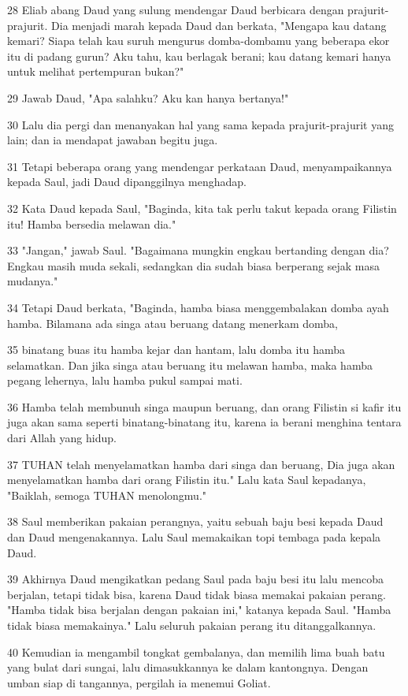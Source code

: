 \par 28 Eliab abang Daud yang sulung mendengar Daud berbicara dengan prajurit-prajurit. Dia menjadi marah kepada Daud dan berkata, "Mengapa kau datang kemari? Siapa telah kau suruh mengurus domba-dombamu yang beberapa ekor itu di padang gurun? Aku tahu, kau berlagak berani; kau datang kemari hanya untuk melihat pertempuran bukan?"
\par 29 Jawab Daud, "Apa salahku? Aku kan hanya bertanya!"
\par 30 Lalu dia pergi dan menanyakan hal yang sama kepada prajurit-prajurit yang lain; dan ia mendapat jawaban begitu juga.
\par 31 Tetapi beberapa orang yang mendengar perkataan Daud, menyampaikannya kepada Saul, jadi Daud dipanggilnya menghadap.
\par 32 Kata Daud kepada Saul, "Baginda, kita tak perlu takut kepada orang Filistin itu! Hamba bersedia melawan dia."
\par 33 "Jangan," jawab Saul. "Bagaimana mungkin engkau bertanding dengan dia? Engkau masih muda sekali, sedangkan dia sudah biasa berperang sejak masa mudanya."
\par 34 Tetapi Daud berkata, "Baginda, hamba biasa menggembalakan domba ayah hamba. Bilamana ada singa atau beruang datang menerkam domba,
\par 35 binatang buas itu hamba kejar dan hantam, lalu domba itu hamba selamatkan. Dan jika singa atau beruang itu melawan hamba, maka hamba pegang lehernya, lalu hamba pukul sampai mati.
\par 36 Hamba telah membunuh singa maupun beruang, dan orang Filistin si kafir itu juga akan sama seperti binatang-binatang itu, karena ia berani menghina tentara dari Allah yang hidup.
\par 37 TUHAN telah menyelamatkan hamba dari singa dan beruang, Dia juga akan menyelamatkan hamba dari orang Filistin itu." Lalu kata Saul kepadanya, "Baiklah, semoga TUHAN menolongmu."
\par 38 Saul memberikan pakaian perangnya, yaitu sebuah baju besi kepada Daud dan Daud mengenakannya. Lalu Saul memakaikan topi tembaga pada kepala Daud.
\par 39 Akhirnya Daud mengikatkan pedang Saul pada baju besi itu lalu mencoba berjalan, tetapi tidak bisa, karena Daud tidak biasa memakai pakaian perang. "Hamba tidak bisa berjalan dengan pakaian ini," katanya kepada Saul. "Hamba tidak biasa memakainya." Lalu seluruh pakaian perang itu ditanggalkannya.
\par 40 Kemudian ia mengambil tongkat gembalanya, dan memilih lima buah batu yang bulat dari sungai, lalu dimasukkannya ke dalam kantongnya. Dengan umban siap di tangannya, pergilah ia menemui Goliat.

